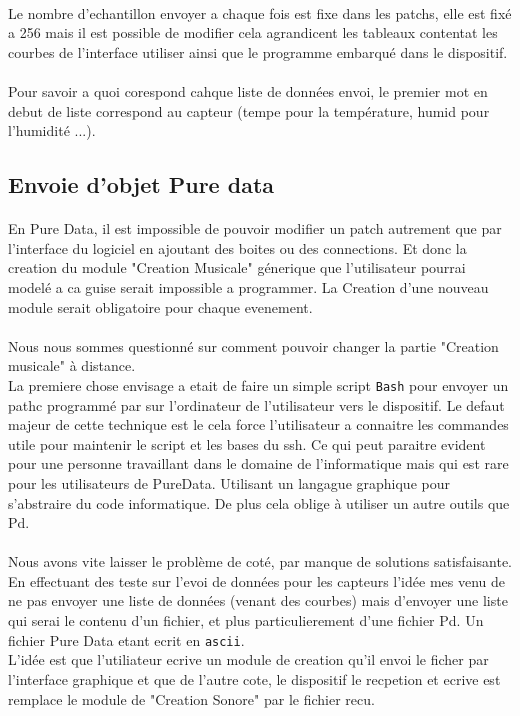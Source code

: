 \documentclass[a4paper, titlepage, oneside, 12pt]{article}%
\begin{document}
\paragraph{}
Le nombre d'echantillon envoyer a chaque fois est fixe dans les patchs, elle est fixé a 256 mais il est possible de modifier cela agrandicent les tableaux contentat les courbes de l'interface utiliser ainsi que le programme embarqué dans le dispositif.
\paragraph{}
Pour savoir a quoi corespond cahque liste de données envoi, le premier mot en debut de liste correspond au capteur (tempe pour la température, humid pour l'humidité ...). 


\subsection{Envoie d'objet Pure data}
\paragraph{}
En Pure Data, il est impossible de pouvoir modifier un patch autrement que par l'interface du logiciel en ajoutant des boites ou des connections. Et donc la creation du module "Creation Musicale" génerique que l'utilisateur pourrai modelé a ca guise serait impossible a programmer. La Creation d'une nouveau module serait obligatoire pour chaque evenement.
\paragraph{}
Nous nous sommes questionné sur comment  pouvoir changer la partie "Creation musicale" à distance.\\
La premiere chose envisage a etait de faire un simple script \texttt{Bash} pour envoyer un pathc programmé par sur l'ordinateur de l'utilisateur vers le dispositif. Le defaut majeur de cette technique est le cela force l'utilisateur a connaitre les commandes utile pour maintenir le script et les bases du ssh. Ce qui peut paraitre evident pour une personne travaillant dans le domaine de l'informatique mais qui est rare pour les utilisateurs de PureData. Utilisant un langague graphique pour s'abstraire du code informatique. De plus cela  oblige à utiliser un autre outils que Pd.

\paragraph{}
Nous avons vite laisser le problème de coté, par manque de solutions satisfaisante.\\
En effectuant des teste sur l'evoi de données pour les capteurs l'idée mes venu de ne pas envoyer une liste de données (venant des courbes) mais d'envoyer une liste qui serai le contenu d'un fichier, et plus particulierement d'une fichier Pd. Un fichier Pure Data etant ecrit en \texttt{ascii}.\\
L'idée est que l'utiliateur ecrive un module de creation qu'il envoi le ficher par l'interface graphique et que de l'autre cote, le dispositif le recpetion et ecrive est remplace le module de "Creation Sonore" par le fichier recu.
\end{document}
